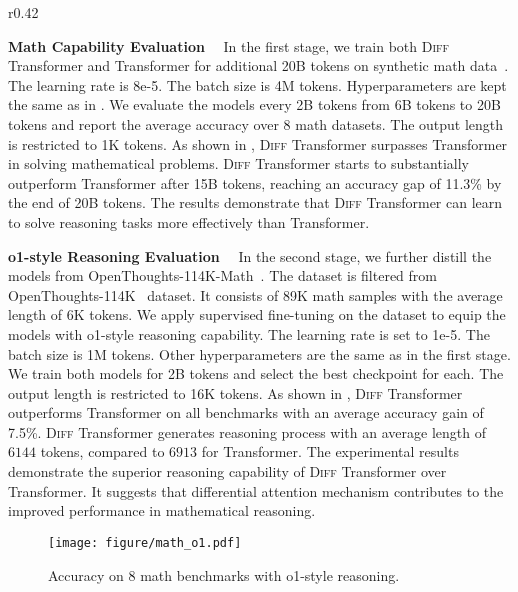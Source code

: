\documentclass{article}
\newcommand{\mypara}[1]{\textbf{#1}~~}
\newcommand\ourattn{differential attention}
\newcommand\abbr{\textsc{Diff}}
\newcommand\diff{\textsc{Diff} Transformer}
\begin{document}
\begin{wrapfigure}{r}{0.42\textwidth}
\vspace{-1.2em}
\centering
\setlength\intextsep{0pt}
\caption{\abbr{} surpasses Transformer in averaged accuracy over 8 math datasets.}
\label{fig:math_sft}
\vspace{-2.0em}
\end{wrapfigure}

\mypara{Math Capability Evaluation}
In the first stage, we train both \diff{} and Transformer for additional 20B tokens on synthetic math data~\citep{glan}. The learning rate is 8e-5. The batch size is 4M tokens. Hyperparameters are kept the same as in . We evaluate the models every 2B tokens from 6B tokens to 20B tokens and report the average accuracy over 8 math datasets. The output length is restricted to 1K tokens. As shown in , \diff{} surpasses Transformer in solving mathematical problems. \diff{} starts to substantially outperform Transformer after 15B tokens, reaching an accuracy gap of 11.3\% by the end of 20B tokens. The results demonstrate that \diff{} can learn to solve reasoning tasks more effectively than Transformer. 

\mypara{o1-style Reasoning Evaluation}
In the second stage, we further distill the models from OpenThoughts-114K-Math~\citep{openthoughtsmath}. The dataset is filtered from OpenThoughts-114K~\citep{openthoughts} dataset. It consists of 89K math samples with the average length of 6K tokens. We apply supervised fine-tuning on the dataset to equip the models with o1-style reasoning capability. The learning rate is set to 1e-5. The batch size is 1M tokens. Other hyperparameters are the same as in the first stage. We train both models for 2B tokens and select the best checkpoint for each. The output length is restricted to 16K tokens. As shown in , \diff{} outperforms Transformer on all benchmarks with an average accuracy gain of 7.5\%. \diff{} generates reasoning process with an average length of $6144$ tokens, compared to $6913$ for Transformer. The experimental results demonstrate the superior reasoning capability of \diff{} over Transformer. It suggests that \ourattn{} mechanism contributes to the improved performance in mathematical reasoning.  

\begin{figure}[t]
\centering
\texttt{[image: figure/math\_o1.pdf]}
\caption{Accuracy on 8 math benchmarks with o1-style reasoning.}
\label{fig:math_o1}
\end{figure}
\end{document}

